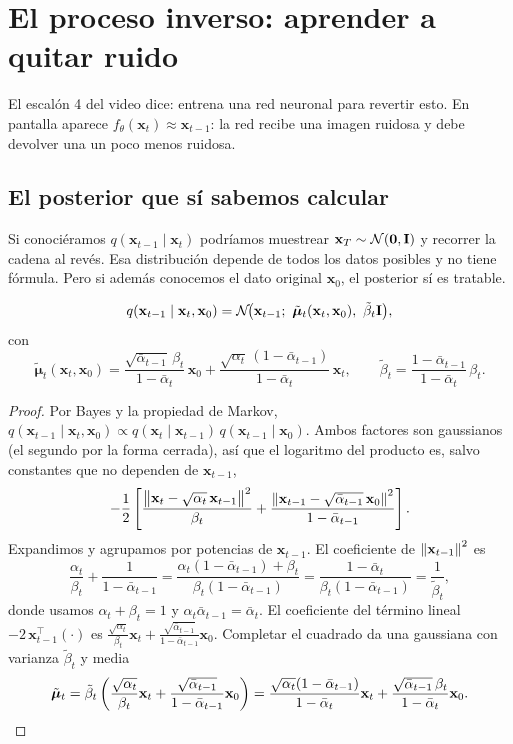 \documentclass[11pt,letterpaper,oneside]{report}
\newcommand{\xb}{\mathbf{x}}
\newcommand{\Ib}{\mathbf{I}}
\newcommand{\ab}{\bar{\alpha}}
\begin{document}
\section{El proceso inverso: aprender a quitar ruido}\label{sec:inverso}

El escalón 4 del video dice: entrena una red neuronal para revertir esto. En pantalla aparece $f_\theta(\xb_t)\approx\xb_{t-1}$: la red recibe una imagen ruidosa y debe devolver una un poco menos ruidosa.

\subsection{El posterior que sí sabemos calcular}

Si conociéramos $q(\xb_{t-1}\mid\xb_t)$ podríamos muestrear $\xb_T\sim\Normal(\mathbf 0,\Ib)$ y recorrer la cadena al revés. Esa distribución depende de todos los datos posibles y no tiene fórmula. Pero si además conocemos el dato original $\xb_0$, el posterior sí es tratable.

\begin{teorema}\label{res:posterior}
\[
q(\xb_{t-1}\mid\xb_t,\xb_0)=\Normal\!\big(\xb_{t-1};\ \tilde{\boldsymbol\mu}_t(\xb_t,\xb_0),\ \tilde\beta_t\Ib\big),
\]
con
\[
\tilde{\boldsymbol\mu}_t(\xb_t,\xb_0)=\frac{\sqrt{\ab_{t-1}}\,\beta_t}{1-\ab_t}\,\xb_0+\frac{\sqrt{\alpha_t}\,(1-\ab_{t-1})}{1-\ab_t}\,\xb_t,
\qquad
\tilde\beta_t=\frac{1-\ab_{t-1}}{1-\ab_t}\,\beta_t .
\]
\end{teorema}

\begin{proof}
Por Bayes y la propiedad de Markov, $q(\xb_{t-1}\mid\xb_t,\xb_0)\propto q(\xb_t\mid\xb_{t-1})\,q(\xb_{t-1}\mid\xb_0)$. Ambos factores son gaussianos (el segundo por la forma cerrada), así que el logaritmo del producto es, salvo constantes que no dependen de $\xb_{t-1}$,
\[
-\frac12\left[\frac{\norm{\xb_t-\sqrt{\alpha_t}\,\xb_{t-1}}^2}{\beta_t}+\frac{\norm{\xb_{t-1}-\sqrt{\ab_{t-1}}\,\xb_0}^2}{1-\ab_{t-1}}\right].
\]
Expandimos y agrupamos por potencias de $\xb_{t-1}$. El coeficiente de $\norm{\xb_{t-1}}^2$ es
\[
\frac{\alpha_t}{\beta_t}+\frac{1}{1-\ab_{t-1}}=\frac{\alpha_t(1-\ab_{t-1})+\beta_t}{\beta_t(1-\ab_{t-1})}=\frac{1-\ab_t}{\beta_t(1-\ab_{t-1})}=\frac{1}{\tilde\beta_t},
\]
donde usamos $\alpha_t+\beta_t=1$ y $\alpha_t\ab_{t-1}=\ab_t$. El coeficiente del término lineal $-2\,\xb_{t-1}^\top(\cdot)$ es
$\frac{\sqrt{\alpha_t}}{\beta_t}\xb_t+\frac{\sqrt{\ab_{t-1}}}{1-\ab_{t-1}}\xb_0$. Completar el cuadrado da una gaussiana con varianza $\tilde\beta_t$ y media
\[
\tilde{\boldsymbol\mu}_t=\tilde\beta_t\left(\frac{\sqrt{\alpha_t}}{\beta_t}\xb_t+\frac{\sqrt{\ab_{t-1}}}{1-\ab_{t-1}}\xb_0\right)
=\frac{\sqrt{\alpha_t}(1-\ab_{t-1})}{1-\ab_t}\xb_t+\frac{\sqrt{\ab_{t-1}}\,\beta_t}{1-\ab_t}\xb_0 .\qedhere
\]
\end{proof}
\end{document}
